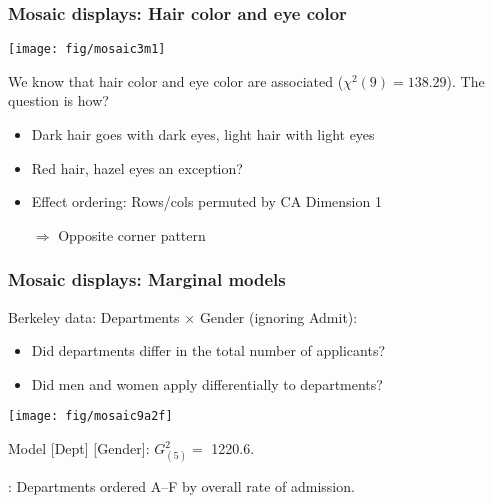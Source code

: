 \begin{frame}
  \frametitle{Mosaic displays: Hair color and eye color}
  \vspace{2ex}
 \begin{minipage}[c]{.49\dispwidth}
  \texttt{[image: fig/mosaic3m1]}
 \end{minipage}%
 \hfill
 \begin{minipage}[c]{.49\dispwidth}
  We know that hair color and eye color are associated ($\chi^2 (9) = 138.29$).
  The question is \alert{how}?
  \begin{itemize}
  \item Dark hair goes with dark eyes, light hair with light eyes
  \item Red hair, hazel eyes an exception?
  \item Effect ordering: Rows/cols permuted by CA Dimension 1
  \item[$\Rightarrow$] Opposite corner pattern
  \end{itemize}
 \end{minipage}
\end{frame}

\begin{frame}
\frametitle{Mosaic displays: Marginal models}
Berkeley data: Departments $\times$ Gender (ignoring Admit):
\begin{itemize}
\item Did departments differ in the total number of applicants?
\item Did men and women apply differentially to departments?
\end{itemize}

 \begin{minipage}[c]{.49\dispwidth}
  \texttt{[image: fig/mosaic9a2f]}
 \end{minipage}%
 \hfill
 \begin{minipage}[c]{.49\dispwidth}
\begin{itemize*}
\item Model [Dept] [Gender]: $G^2_{(5)} =$ 1220.6.
\item {}: Departments ordered A--F by overall rate of admission.
\end{itemize*}
 \end{minipage}
	
\end{frame}

